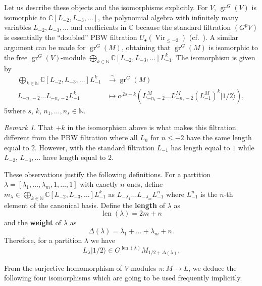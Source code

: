 \documentclass[12pt, a4paper]{article}
\theoremstyle{remark}
\newtheorem{remark}[theorem]{Remark}
\DeclareMathOperator{\Vir}{Vir}
\DeclareMathOperator{\gr}{gr}
\DeclareMathOperator{\len}{len}
\newcommand{\vachalf}{|1/2\rangle}
\begin{document}
Let us describe these objects and the isomorphisms explicitly.
For $V$, $\gr^G(V)$ is isomorphic to $\mathbb{C}[L_{-2}, L_{-3}, \dots]$, the polynomial algebra with infinitely many variables $L_{-2}, L_{-3}, \dots$ and coefficients in $\mathbb{C}$ because the standard filtration $(G^pV)$ is essentially the ``doubled'' PBW filtration $U_\bullet(\Vir_{\le -2})$ (cf.\ \cite{arakawa_remark_2012}).
A similar argument can be made for $\gr^G(M)$, obtaining that $\gr^G(M)$ is isomorphic to the free $\gr^G(V)$-module $\bigoplus_{k \in \mathbb{N}}\mathbb{C}[L_{-2}, L_{-3}, \dots]L_{-1}^k$.
The isomorphism is given by
\begin{align*}
  \bigoplus_{k \in \mathbb{N}}\mathbb{C}[L_{-2}, L_{-3}, \dots]L_{-1}^k &\xrightarrow{\sim} \gr^G(M) \\
  L_{-n_1 - 2}\dots L_{-n_s - 2}L_{-1}^k &\mapsto \alpha^{2s + k}(L_{-n_1 - 2}^M\dots L_{-n_s - 2}^M(L_{-1}^M)^k\vachalf),
\end{align*}
5where $s$, $k$, $n_1,\dots, n_s \in \mathbb{N}$.
\begin{remark}
  \label{rmk:6}
  That $+k$ in the isomorphism above is what makes this filtration different from the PBW filtration where all $L_n$ for $n \le -2$ have the same length equal to $2$.
  However, with the standard filtration $L_{-1}$ has length equal to $1$ while $L_{-2}$, $L_{-3}, \dots$ have length equal to $2$.
\end{remark}

These observations justify the following definitions.
For a partition $\lambda = [\lambda_1, \dots, \lambda_m, 1, \dots, 1]$ with exactly $n$ ones, define $m_\lambda \in \bigoplus_{k \in \mathbb{N}}\mathbb{C}[L_{-2}, L_{-3}, \dots]L_{-1}^k$ as $L_{-\lambda_1}\dots L_{-\lambda_m}L_{-1}^n$ where $L_{-1}^n$ is the $n$-th element of the canonical basis.
Define the \textbf{length} of $\lambda$ as
\begin{equation*}
  \len(\lambda) = 2m + n
\end{equation*}
and the \textbf{weight} of $\lambda$ as
\begin{equation*}
  \Delta(\lambda) = \lambda_1 + \dots + \lambda_m + n.
\end{equation*}
Therefore, for a partition $\lambda$ we have
\begin{equation*}
  L_{\lambda}\vachalf \in G^{\len(\lambda)}M_{1/2 + \Delta(\lambda)}.
\end{equation*}

From the surjective homomorphism of $V$-modules $\pi: M \to L$, we deduce the following four isomorphisms which are going to be used frequently implicitly.
\end{document}
